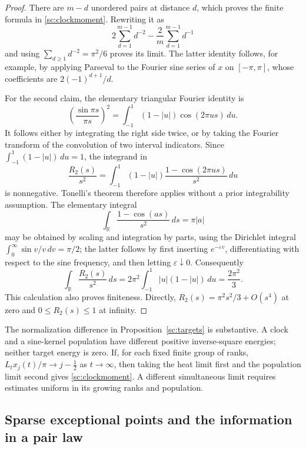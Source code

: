 \begin{proof}
There are $m-d$ unordered pairs at distance $d$, which proves the finite
formula in \eqref{sc:clockmoment}. Rewriting it as
\[
 2\sum_{d=1}^{m-1}d^{-2}
 -\frac2m\sum_{d=1}^{m-1}d^{-1}
\]
and using $\sum_{d\ge1}d^{-2}=\pi^2/6$ proves its limit. The latter
identity follows, for example, by applying Parseval to the Fourier sine
series of $x$ on $[-\pi,\pi]$, whose coefficients are
$2(-1)^{d+1}/d$.

For the second claim, the elementary triangular Fourier identity is
\begin{equation}
 \left(\frac{\sin\pi s}{\pi s}\right)^2
 =\int_{-1}^{1}(1-|u|)\cos(2\pi us)\,du.
 \label{sc:triangular}
\end{equation}
It follows either by integrating the right side twice, or by taking the
Fourier transform of the convolution of two interval indicators. Since
$\int_{-1}^{1}(1-|u|)\,du=1$, the integrand in
\[
 \frac{R_2(s)}{s^2}
 =\int_{-1}^{1}(1-|u|)
       \frac{1-\cos(2\pi us)}{s^2}\,du
\]
is nonnegative. Tonelli's theorem therefore applies without a prior
integrability assumption. The elementary integral
\[
 \int_{\mathbb R}\frac{1-\cos(as)}{s^2}\,ds=\pi|a|
\]
may be obtained by scaling and integration by parts, using the
Dirichlet integral $\int_0^\infty\sin v/v\,dv=\pi/2$; the latter follows
by first inserting $e^{-\varepsilon v}$, differentiating with respect
to the sine frequency, and then letting $\varepsilon\downarrow0$.
Consequently
\[
 \int_{\mathbb R}\frac{R_2(s)}{s^2}\,ds
 =2\pi^2\int_{-1}^{1}|u|(1-|u|)\,du
 =\frac{2\pi^2}{3}.
\]
This calculation also proves finiteness. Directly,
$R_2(s)=\pi^2s^2/3+O(s^4)$ at zero and $0\le R_2(s)\le1$ at infinity.
\end{proof}

The normalization difference in Proposition~\ref{sc:targets} is
substantive. A clock and a sine-kernel population have different positive
inverse-square energies; neither target energy is zero. If, for each
fixed finite group of ranks, $L_t x_j(t)/\pi\to j-\tfrac12$ as
$t\to\infty$, then taking the heat limit first and the population limit
second gives \eqref{sc:clockmoment}. A different simultaneous limit
requires estimates uniform in its growing ranks and population.

\subsection{Sparse exceptional points and the information in a pair law}
\label{sc:sparse}

